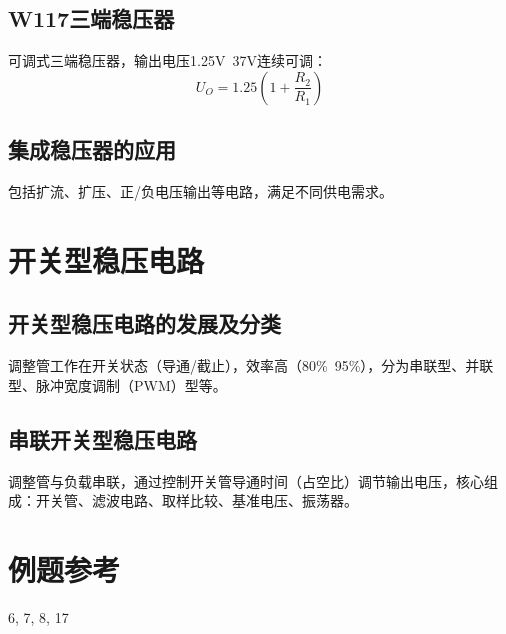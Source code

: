 \subsection{\texorpdfstring{W117三端稳压器}{W117三端稳压器}}
可调式三端稳压器，输出电压1.25V~37V连续可调：
\[ U_O = 1.25 \left(1 + \frac{R_2}{R_1}\right) \]

\subsection{集成稳压器的应用}
包括扩流、扩压、正/负电压输出等电路，满足不同供电需求。

\section{\texorpdfstring{开关型稳压电路}{开关型稳压电路}}
\subsection{开关型稳压电路的发展及分类}
调整管工作在开关状态（导通/截止），效率高（80\%~95\%），分为串联型、并联型、脉冲宽度调制（PWM）型等。

\subsection{串联开关型稳压电路}
调整管与负载串联，通过控制开关管导通时间（占空比）调节输出电压，核心组成：开关管、滤波电路、取样比较、基准电压、振荡器。

\section{例题参考}
6, 7, 8, 17